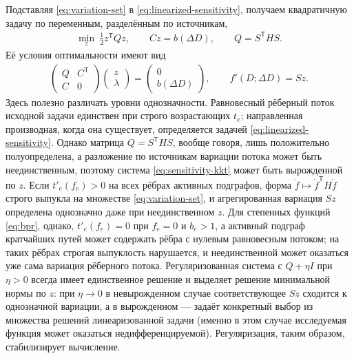 \documentclass{crm-article}
\begin{document}
Подставляя \eqref{eq:variation-set} в
\eqref{eq:linearized-sensitivity}, получаем квадратичную задачу по переменным,
разделённым по источникам,
\begin{gather}
 \min\limits_z\ \frac12 z^{\mathsf T}Qz,
 \qquad Cz=b(\Delta D),
 \qquad Q=S^{\mathsf T}HS.
 \label{eq:origin-sensitivity}
\end{gather}
Её условия оптимальности имеют вид
\begin{gather}
 \begin{pmatrix}
  Q & C^{\mathsf T}\\
  C & 0
 \end{pmatrix}
 \begin{pmatrix}z\\ \lambda\end{pmatrix}
 =
 \begin{pmatrix}0\\ b(\Delta D)\end{pmatrix},
 \qquad
 f'(D;\Delta D)=Sz.
 \label{eq:sensitivity-kkt}
\end{gather}
Здесь полезно различать уровни однозначности. Равновесный рёберный поток
исходной задачи единствен при строго возрастающих $t_e$; направленная
производная, когда она существует, определяется задачей
\eqref{eq:linearized-sensitivity}. Однако матрица $Q=S^{\mathsf T}HS$,
вообще говоря, лишь положительно полуопределена, а разложение по источникам
вариации потока может быть неединственным, поэтому система
\eqref{eq:sensitivity-kkt} может быть вырожденной по $z$. Если
$t'_e(f_e)>0$ на всех рёбрах активных подграфов, форма
$\dot f\mapsto\dot f^{\mathsf T}H\dot f$ строго выпукла на множестве
\eqref{eq:variation-set}, и агрегированная вариация $Sz$ определена
однозначно даже при неединственном $z$. Для степенных функций \eqref{eq:bpr}, однако,
$t'_e(f_e)=0$ при $f_e=0$ и $b_e>1$, а активный подграф кратчайших путей
может содержать рёбра с нулевым равновесным потоком; на таких рёбрах
строгая выпуклость нарушается, и неединственной может оказаться уже сама
вариация рёберного потока. Регуляризованная система с $Q+\eta I$ при
$\eta>0$ всегда имеет единственное решение и выделяет решение минимальной
нормы по $z$: при $\eta\to0$ в невырожденном случае соответствующее $Sz$
сходится к однозначной вариации, а в вырожденном --- задаёт конкретный
выбор из множества решений линеаризованной задачи (именно в этом случае
исследуемая функция может оказаться недифференцируемой). Регуляризация, таким
образом, стабилизирует вычисление.
\end{document}
